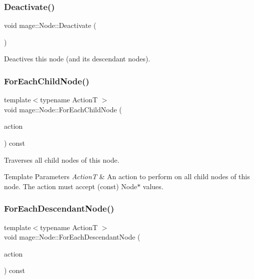 \subsubsection{\texorpdfstring{Deactivate()}{Deactivate()}}
{\footnotesize\ttfamily void mage\+::\+Node\+::\+Deactivate (\begin{DoxyParamCaption}{ }\end{DoxyParamCaption})\hspace{0.3cm}{\ttfamily [noexcept]}}

Deactives this node (and its descendant nodes). \hypertarget{classmage_1_1_node_afedb523a462952ec29aed7504d0a71d4}{}\label{classmage_1_1_node_afedb523a462952ec29aed7504d0a71d4} 
\subsubsection{\texorpdfstring{For\+Each\+Child\+Node()}{ForEachChildNode()}}
{\footnotesize\ttfamily template$<$typename ActionT $>$ \\
void mage\+::\+Node\+::\+For\+Each\+Child\+Node (\begin{DoxyParamCaption}\item[{ActionT}]{action }\end{DoxyParamCaption}) const}

Traverses all child nodes of this node.


\begin{DoxyTemplParams}{Template Parameters}
{\em ActionT} & An action to perform on all child nodes of this node. The action must accept ({\ttfamily const}) {\ttfamily Node$\ast$} values. \\
\hline
\end{DoxyTemplParams}
\hypertarget{classmage_1_1_node_a86668c371e1452204b52f2896cbb16fd}{}\label{classmage_1_1_node_a86668c371e1452204b52f2896cbb16fd} 
\subsubsection{\texorpdfstring{For\+Each\+Descendant\+Node()}{ForEachDescendantNode()}}
{\footnotesize\ttfamily template$<$typename ActionT $>$ \\
void mage\+::\+Node\+::\+For\+Each\+Descendant\+Node (\begin{DoxyParamCaption}\item[{ActionT}]{action }\end{DoxyParamCaption}) const}

